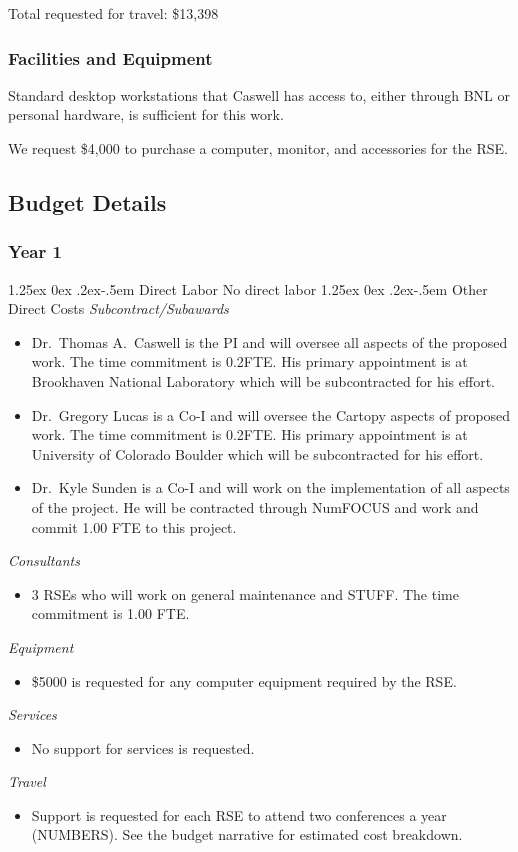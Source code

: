\documentclass[12pt]{article}
\makeatletter
\numberwithin{page}{section}
\renewcommand{\paragraph}{%
  \@startsection{paragraph}{4}%
  {\z@}{1.25ex \@plus 0ex \@minus .2ex}{-.5em}%
  {\normalfont\normalsize\itshape\bfseries}%
}
\makeatother
\begin{document}
Total requested for travel: \$13,398

\subsubsection{Facilities and Equipment}

Standard desktop workstations that Caswell has access to, either
through BNL or personal hardware, is sufficient for this work.

We request \$4,000 to purchase a computer, monitor, and accessories
for the RSE.

\subsection{Budget Details}
\subsubsection{Year 1}
\paragraph{Direct Labor}
No direct labor
\paragraph{Other Direct Costs}
\textit{Subcontract/Subawards}
\begin{itemize}
  \item Dr.\ Thomas A.\ Caswell is the PI and will oversee all aspects of the
  proposed work.  The time commitment is 0.2FTE.  His primary
  appointment is at Brookhaven National Laboratory which will be
  subcontracted for his effort.
\item Dr.\ Gregory Lucas is a Co-I and will oversee the Cartopy aspects of
  proposed work.  The time commitment is 0.2FTE.  His primary appointment is at
  University of Colorado Boulder which will be subcontracted for his effort.
\item Dr.\ Kyle Sunden is a Co-I and will work on the implementation of all
  aspects of the project.  He will be contracted through NumFOCUS and work and
  commit 1.00 FTE to this project.
\end{itemize}
\textit{Consultants}
\begin{itemize}
\item 3 RSEs who will work on general maintenance and STUFF.  The time commitment is 1.00
  FTE.
\end{itemize}
\textit{Equipment}
\begin{itemize}
\item \$5000 is requested for any computer equipment required by the RSE.
\end{itemize}
\textit{Services}
\begin{itemize}
\item No support for services is requested.
\end{itemize}
\textit{Travel}
\begin{itemize}
\item Support is requested for each RSE to attend two conferences a
  year (NUMBERS).  See the budget narrative for estimated cost
  breakdown.
\end{itemize}
\end{document}

